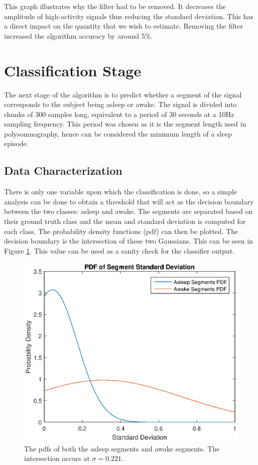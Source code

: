             This graph illustrates why the filter had to be removed. It decreases the amplitude of high-activity signals thus reducing the standard deviation. This has a direct impact on the quantity that we wish to estimate. Removing the filter increased the algorithm accuracy by around 5\%.           

        \section{Classification Stage}

            The next stage of the algorithm is to predict whether a segment of the signal corresponds to the subject being asleep or awake. The signal is divided into chunks of 300 samples long, equivalent to a period of 30 seconds at a 10Hz sampling frequency. This period was chosen as it is the segment length used in polysomnography, hence can be considered the minimum length of a sleep episode.

            \subsection{Data Characterization}

                There is only one variable upon which the classification is done, so a simple analysis can be done to obtain a threshold that will act as the decision boundary between the two classes: asleep and awake. The segments are separated based on their ground truth class and the mean and standard deviation is computed for each class. The probability density functions (pdf) can then be plotted. The decision boundary is the intersection of these two Gaussians. This can be seen in Figure \ref{img_pdfs}. This value can be used as a sanity check for the classifier output.

                \begin{figure}[h]
                    \includegraphics[width=\textwidth]{Images/segment_pdfs.eps}
                    \centering
                    \caption{The pdfs of both the asleep segments and awake segments. The intersection occurs at $\sigma = 0.221$.}
                    \label{img_pdfs}
                \end{figure}

